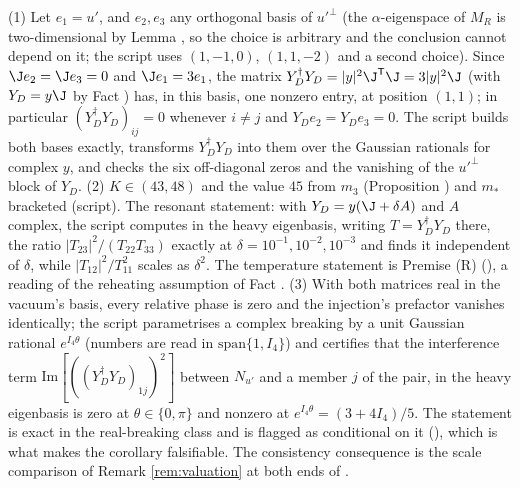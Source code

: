(1) Let $e_{1} = u'$, and $e_{2}, e_{3}$ any orthogonal basis of $u'^{\perp}$ (the $\alpha$-eigenspace of $M_{R}$ is two-dimensional by Lemma , so the choice is arbitrary and the conclusion cannot depend on it; the script uses $(1, -1, 0)$, $(1, 1, -2)$ and a second choice). Since $\J e_{2} = \J e_{3} = 0$ and $\J e_{1} = 3e_{1}$, the matrix $Y_{D}^{\dagger}Y_{D} = |y|^{2}\J^{\mathsf{T}}\J = 3|y|^{2}\J$ (with $Y_{D} = y\J$ by Fact ) has, in this basis, one nonzero entry, at position $(1,1)$; in particular $(Y_{D}^{\dagger}Y_{D})_{ij} = 0$ whenever $i \neq j$ and $Y_{D}e_{2} = Y_{D}e_{3} = 0$. The script builds both bases exactly, transforms $Y_{D}^{\dagger}Y_{D}$ into them over the Gaussian rationals for complex $y$, and checks the six off-diagonal zeros and the vanishing of the $u'^{\perp}$ block of $Y_{D}$. (2) $K \in (43, 48)$ and the value $45$ from $m_{3}$ (Proposition ) and $m_{*}$ bracketed (script). The resonant statement: with $Y_{D} = y(\J + \delta A)$ and $A$ complex, the script computes in the heavy eigenbasis, writing $T = Y_{D}^{\dagger}Y_{D}$ there, the ratio $|T_{23}|^{2}/(T_{22}T_{33})$ exactly at $\delta = 10^{-1}, 10^{-2}, 10^{-3}$ and finds it independent of $\delta$, while $|T_{12}|^{2}/T_{11}^{2}$ scales as $\delta^{2}$. The temperature statement is Premise (R) (), a reading of the reheating assumption of Fact . (3) With both matrices real in the vacuum's basis, every relative phase is zero and the injection's prefactor vanishes identically; the script parametrises a complex breaking by a unit Gaussian rational $e^{I_4\theta}$ (numbers are read in $\mathrm{span}\{1, I_4\}$) and certifies that the interference term $\mathrm{Im}[((Y_{D}^{\dagger}Y_{D})_{1j})^{2}]$ between $N_{u'}$ and a member $j$ of the pair, in the heavy eigenbasis is zero at $\theta \in \{0, \pi\}$ and nonzero at $e^{I_4\theta} = (3 + 4I_4)/5$. The statement is exact in the real-breaking class and is flagged as conditional on it (), which is what makes the corollary falsifiable. The consistency consequence is the scale comparison of Remark \ref{rem:valuation} at both ends of .
